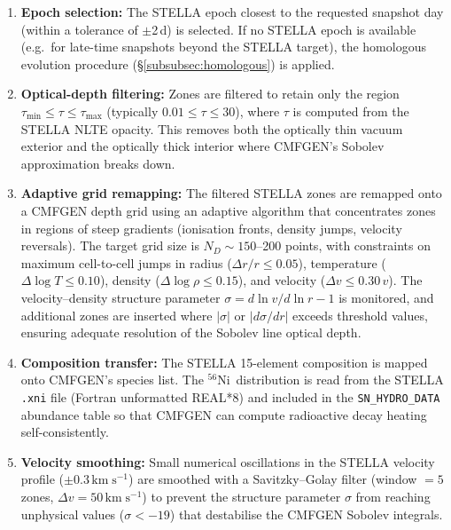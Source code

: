 \documentclass[11pt, a4paper]{article}
\newcommand{\kms}{\ensuremath{\mathrm{km\;s^{-1}}}}
\newcommand{\taumin}{\ensuremath{\tau_{\mathrm{min}}}}
\newcommand{\taumax}{\ensuremath{\tau_{\mathrm{max}}}}
\newcommand{\Ni}{\ensuremath{^{56}\mathrm{Ni}}}
\newcommand{\sigmav}{\ensuremath{\sigma}}
\begin{document}
\begin{enumerate}
    \item \textbf{Epoch selection:} The STELLA epoch closest to the
    requested snapshot day (within a tolerance of $\pm$2\,d) is selected.
    If no STELLA epoch is available (e.g.\ for late-time snapshots beyond
    the STELLA target), the homologous evolution procedure
    (\S\ref{subsubsec:homologous}) is applied.

    \item \textbf{Optical-depth filtering:} Zones are filtered to retain
    only the region $\taumin \leq \tau \leq \taumax$ (typically
    $0.01 \leq \tau \leq 30$), where $\tau$ is computed from the
    STELLA NLTE opacity.  This removes both the optically thin vacuum
    exterior and the optically thick interior where CMFGEN's
    Sobolev approximation breaks down.

    \item \textbf{Adaptive grid remapping:} The filtered STELLA zones are
    remapped onto a CMFGEN depth grid using an adaptive algorithm that
    concentrates zones in regions of steep gradients (ionisation fronts,
    density jumps, velocity reversals).  The target grid size is
    $N_D \sim 150$--200 points, with constraints on maximum cell-to-cell
    jumps in radius ($\Delta r / r \leq 0.05$), temperature
    ($\Delta \log T \leq 0.10$), density ($\Delta \log \rho \leq 0.15$),
    and velocity ($\Delta v \leq 0.30\,v$).  The velocity--density
    structure parameter $\sigmav = d\ln v / d\ln r - 1$ is monitored, and
    additional zones are inserted where $|\sigmav|$ or $|d\sigmav / dr|$
    exceeds threshold values, ensuring adequate resolution of the
    Sobolev line optical depth.

    \item \textbf{Composition transfer:} The STELLA 15-element composition
    is mapped onto CMFGEN's species list.  The \Ni\ distribution is read
    from the STELLA \texttt{.xni} file (Fortran unformatted REAL*8) and
    included in the \texttt{SN\_HYDRO\_DATA} abundance table so that
    CMFGEN can compute radioactive decay heating self-consistently.

    \item \textbf{Velocity smoothing:} Small numerical oscillations in
    the STELLA velocity profile ($\pm 0.3\,\kms$) are smoothed with a
    Savitzky--Golay filter (window $= 5$ zones, $\Delta v = 50\,\kms$)
    to prevent the structure parameter $\sigmav$ from reaching unphysical
    values ($\sigmav < -19$) that destabilise the CMFGEN Sobolev
    integrals.
\end{enumerate}
\end{document}
